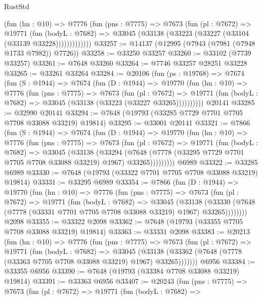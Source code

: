 \begin{lexlean}{RustStd}
\begin{coremodule}
{\begin{coremodule}
{{{{{{{{{{{{{{{{{{{{{{{{{{{{{{{{{{{{{{{{{{{{{{{{{{{{{            (fun (hn : @10) =>
            @7776
              (fun (pns : @7775) =>
              @7673
                (fun (pl : @7672) =>
                @19771
                  (fun (bodyL : @7682) =>
                  @33045 (@33138 (@33223 (@33227 (@33104 (@33139 @33228)))))))))))))
@33257 := @14137 (@12995 (@7943 (@7981 (@7948 @1733 @7982)) @7726))
@33258 := @33250 @33257
@33260 := @33102 (@7739 @33257)
@33261 := @7648 @33260
@33264 := @7746 @33257 @28251 @33228
@33265 := @33261 @33264
@33284 := @20106
    (fun (ps : @19768) =>
    @7674
      (fun (S : @1944) =>
      @7674
        (fun (D : @1944) =>
        @19770
          (fun (hn : @10) =>
          @7776
            (fun (pns : @7775) =>
            @7673
              (fun (pl : @7672) =>
              @19771 (fun (bodyL : @7682) => @33045 (@33138 (@33223 (@33227 @33265))))))))))
    @20141
@33285 := @32990 @20141
@33294 := @7648 (@19793 (@33285 @7729 @7701 @7705 @7708 @33088 @33219) @19814)
@33295 := @33001 @20141
@33321 := @7866
    (fun (S : @1944) =>
    @7674
      (fun (D : @1944) =>
      @19770
        (fun (hn : @10) =>
        @7776
          (fun (pns : @7775) =>
          @7673
            (fun (pl : @7672) =>
            @19771
              (fun (bodyL : @7682) =>
              @33045
                (@33138
                  (@33294
                    (@7648
                      (@7778 (@33295 @7729 @7701 @7705 @7708 @33088 @33219) @1967)
                      @33265)))))))))
    @6989
@33322 := @33285 @6989
@33330 := @7648 (@19793 (@33322 @7701 @7705 @7708 @33088 @33219) @19814)
@33331 := @33295 @6989
@33354 := @7866
    (fun (D : @1944) =>
    @19770
      (fun (hn : @10) =>
      @7776
        (fun (pns : @7775) =>
        @7673
          (fun (pl : @7672) =>
          @19771
            (fun (bodyL : @7682) =>
            @33045
              (@33138
                (@33330 (@7648 (@7778 (@33331 @7701 @7705 @7708 @33088 @33219) @1967) @33265))))))))
    @2098
@33355 := @33322 @2098
@33362 := @7648 (@19793 (@33355 @7705 @7708 @33088 @33219) @19814)
@33363 := @33331 @2098
@33383 := @20213
    (fun (hn : @10) =>
    @7776
      (fun (pns : @7775) =>
      @7673
        (fun (pl : @7672) =>
        @19771
          (fun (bodyL : @7682) =>
          @33045
            (@33138 (@33362 (@7648 (@7778 (@33363 @7705 @7708 @33088 @33219) @1967) @33265)))))))
    @6956
@33384 := @33355 @6956
@33390 := @7648 (@19793 (@33384 @7708 @33088 @33219) @19814)
@33391 := @33363 @6956
@33407 := @20243
    (fun (pns : @7775) =>
    @7673
      (fun (pl : @7672) =>
      @19771
        (fun (bodyL : @7682) =>
}}}}}}}}}}}}}}}}}}}}}}}}}}}}}}}}}}}}}}}}}}}}}}}}}}}}}
\end{coremodule}}
\end{coremodule}
\end{lexlean}
